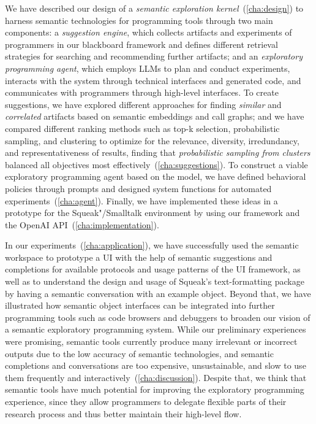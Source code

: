 We have described our design of a \emph{semantic exploration kernel}~(\cref{cha:design}) to harness semantic technologies for programming tools through two main components:
a \emph{suggestion engine}, which collects artifacts and experiments of programmers in our blackboard framework and defines different retrieval strategies for searching and recommending further artifacts;
and an \emph{exploratory programming agent}, which employs LLMs to plan and conduct experiments, interacts with the system through technical interfaces and generated code, and communicates with programmers through high-level interfaces.
To create suggestions, we have explored different approaches for finding \emph{similar} and \emph{correlated} artifacts based on semantic embeddings and call graphs; and we have compared different ranking methods such as top-k selection, probabilistic sampling, and clustering to optimize for the relevance, diversity, irredundancy, and representativeness of results, finding that \emph{probabilistic sampling from clusters} balanced all objectives most effectively~(\cref{cha:suggestions}).
To construct a viable exploratory programming agent based on the \gptfouro model, we have defined behavioral policies through prompts and designed system functions for automated experiments~(\cref{cha:agent}).
Finally, we have implemented these ideas in a prototype for the Squeak"/Smalltalk environment by using our \semtex framework and the OpenAI API~(\cref{cha:implementation}).

In our experiments~(\cref{cha:application}), we have successfully used the semantic workspace to prototype a UI with the help of semantic suggestions and completions for available protocols and usage patterns of the UI framework, as well as to understand the design and usage of Squeak's text-formatting package by having a semantic conversation with an example object.
Beyond that, we have illustrated how semantic object interfaces can be integrated into further programming tools such as code browsers and debuggers to broaden our vision of a semantic exploratory programming system.
While our preliminary experiences were promising, semantic tools currently produce many irrelevant or incorrect outputs due to the low accuracy of semantic technologies, and semantic completions and conversations are too expensive, unsustainable, and slow to use them frequently and interactively~(\cref{cha:discussion}).
Despite that, we think that semantic tools have much potential for improving the exploratory programming experience, since they allow programmers to delegate flexible parts of their research process and thus better maintain their high-level flow.

